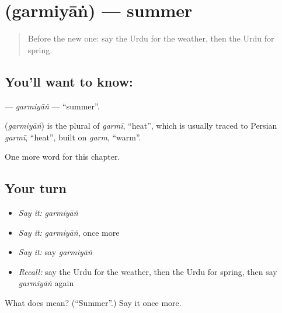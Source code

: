 \section[\texorpdfstring{\ur{گرمیاں} (garmiyāṅ)}{گرمیاں (garmiyāṅ)}]{ (garmiyāṅ) — summer}

\label{lesson:UR-C94-garmiyan}



\begin{quote}
Before the new one: say the Urdu for the weather, then the Urdu for spring.
\end{quote}

\subsection*{You'll want to know: }
\textbf{} — \emph{garmiyāṅ} — \textquotedblleft{}summer\textquotedblright{}.

\begin{cousinweb}
\textbf{} (\emph{garmiyāṅ}) is the plural of \emph{garmī}, \textquotedblleft{}heat\textquotedblright{}, which is usually traced to Persian \emph{garmī}, \textquotedblleft{}heat\textquotedblright{}, built on \emph{garm}, \textquotedblleft{}warm\textquotedblright{}.
\end{cousinweb}

\begin{grammarlens}[title={What you've built}]
One more word for this chapter.
\end{grammarlens}

\subsection*{Your turn}
\begin{itemize}
\raggedright
  \item \emph{Say it:} \emph{garmiyāṅ}
  \item \emph{Say it:} \emph{garmiyāṅ}, once more
  \item \emph{Say it:} say \emph{garmiyāṅ}
  \item \emph{Recall:} say the Urdu for the weather, then the Urdu for spring, then say \emph{garmiyāṅ} again
\end{itemize}

\begin{tcolorbox}[breakable,colback=teal!4,colframe=teal!35!black,title={Before you move on}]
What does  mean? (\textquotedblleft{}Summer\textquotedblright{}.) Say it once more.
\end{tcolorbox}
